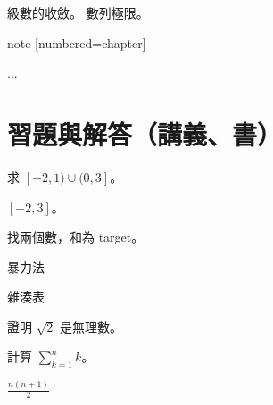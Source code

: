 \documentclass[lang=zh, thmnames=native, letters=bold, tikz=full, twocolumn]{akizumi-note}
\begin{document}
\begin{cheat}
\begin{chapterguide}
 級數的收斂。
 數列極限。
\end{chapterguide}
\end{cheat}

\begin{cheatsrc}{note}
[numbered=chapter]
\begin{keypoint}\label{kp:a} ... \end{keypoint}  %
\end{cheatsrc}

\section{習題與解答（講義、書）}
\begin{cheat}
\begin{exercise}[聯集]\label{ex:u}
求 $[-2,1) \cup (0,3]$。
\end{exercise}
\begin{solution}
$[-2,3]$。
\end{solution}
\begin{example-problem}[title=Two Sum,
  source=LeetCode 1]
找兩個數，和為 target。
\begin{parts}
\item 暴力法 \item 雜湊表
\end{parts}
\end{example-problem}
\end{cheat}

\begin{cheat}
\begin{exercises}[title]
\item 證明 $\sqrt{2}$ 是無理數。
\item 計算 $\sum_{k=1}^n k$。
  \begin{solution}
  $\frac{n(n+1)}{2}$
  \end{solution}
\end{exercises}
\end{cheat}

\end{document}
